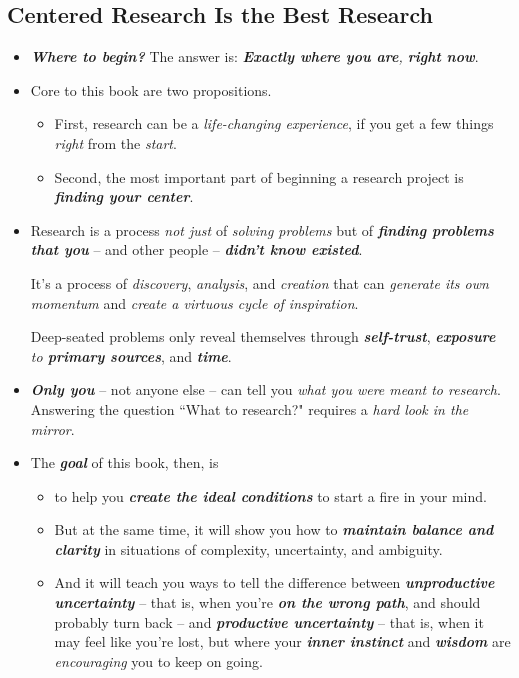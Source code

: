 \documentclass[11pt]{article}
\begin{document}
\subsection{Centered Research Is the Best Research}
\begin{itemize}
\item \emph{\textbf{Where to begin?}} The answer is: \emph{\textbf{Exactly where you are}, \textbf{right now}}.

\item Core to this book are two propositions. 
\begin{itemize}
\item First, research can be a \emph{life-changing experience}, if you get a few things \emph{right} from the \emph{start}. 
\item Second, the most important part of beginning a research project is \emph{\textbf{finding your center}}. 
\end{itemize}

\item Research is a process \emph{not just} of \emph{solving problems} but of \emph{\textbf{finding problems that you}} -- and other people -- \emph{\textbf{didn’t know existed}}.

It’s a process of \emph{discovery}, \emph{analysis}, and \emph{creation} that can \emph{generate its own momentum} and \emph{create a virtuous cycle of inspiration}.

Deep-seated problems only reveal themselves through \emph{\textbf{self-trust}}, \emph{\textbf{exposure} to \textbf{primary sources}}, and \emph{\textbf{time}}. 

\item \emph{\textbf{Only you}} -- not anyone else -- can tell you \emph{what you were meant to research}. Answering the question ``What to research?" requires a \emph{hard look in the mirror}.

\item The \emph{\textbf{goal}} of this book, then, is 
\begin{itemize}
\item to help you \emph{\textbf{create the ideal conditions}} to start a fire in your mind.

\item But at the same time, it will show you how to \emph{\textbf{maintain balance and clarity}} in situations of complexity, uncertainty, and ambiguity. 

\item And it will teach you ways to tell the difference between \emph{\textbf{unproductive uncertainty}} -- that is, when you’re \emph{\textbf{on the wrong path}}, and should probably turn back -- and \emph{\textbf{productive uncertainty}} -- that is, when it may feel like you’re lost, but where your \emph{\textbf{inner instinct}} and \emph{\textbf{wisdom}} are \emph{encouraging} you to keep on going.
\end{itemize}
\end{itemize}
\end{document}
